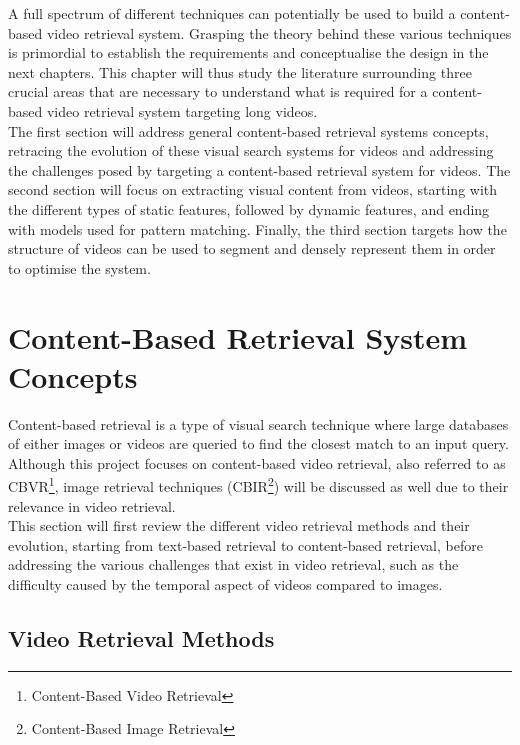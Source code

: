A full spectrum of different techniques can potentially be used to build a content-based video retrieval system. Grasping the theory behind these various techniques is primordial to establish the requirements and conceptualise the design in the next chapters. This chapter will thus study the literature surrounding three crucial areas that are necessary to understand what is required for a content-based video retrieval system targeting long videos.\\

The first section will address general content-based retrieval systems concepts, retracing the evolution of these visual search systems for videos and addressing the challenges posed by targeting a content-based retrieval system for videos. The second section will focus on extracting visual content from videos, starting with the different types of static features, followed by dynamic features, and ending with models used for pattern matching. Finally, the third section targets how the structure of videos can be used to segment and densely represent them in order to optimise the system.

\section{Content-Based Retrieval System Concepts}

Content-based retrieval is a type of visual search technique where large databases of either images or videos are queried to find the closest match to an input query. Although this project focuses on content-based video retrieval, also referred to as CBVR\footnote{Content-Based Video Retrieval}, image retrieval techniques (CBIR\footnote{Content-Based Image Retrieval}) will be discussed as well due to their relevance in video retrieval.\\

This section will first review the different video retrieval methods and their evolution, starting from text-based retrieval to content-based retrieval, before addressing the various challenges that exist in video retrieval, such as the difficulty caused by the temporal aspect of videos compared to images.


\subsection{Video Retrieval Methods}
\label{sec:cbvr-methods}

